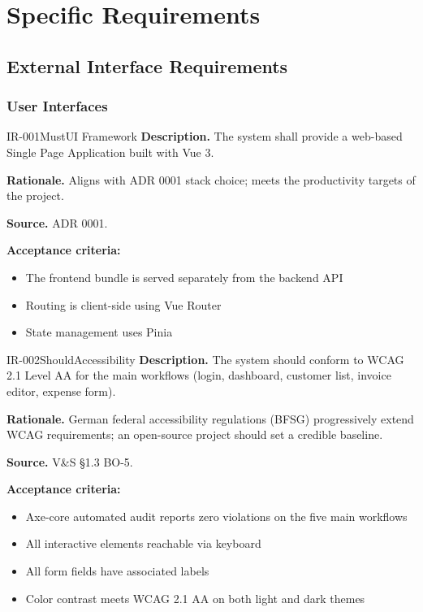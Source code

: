 \documentclass[11pt,a4paper]{article}
\begin{document}
\section{Specific Requirements}

\subsection{External Interface Requirements}

\subsubsection{User Interfaces}

\begin{requirement}{IR-001}{Must}{UI Framework}
\textbf{Description.} The system shall provide a web-based Single Page Application built with Vue 3.

\textbf{Rationale.} Aligns with ADR 0001 stack choice; meets the productivity targets of the project.

\textbf{Source.} ADR 0001.

\textbf{Acceptance criteria:}
\begin{itemize}
    \item The frontend bundle is served separately from the backend API
    \item Routing is client-side using Vue Router
    \item State management uses Pinia
\end{itemize}
\end{requirement}

\begin{requirement}{IR-002}{Should}{Accessibility}
\textbf{Description.} The system should conform to WCAG 2.1 Level AA for the main workflows (login, dashboard, customer list, invoice editor, expense form).

\textbf{Rationale.} German federal accessibility regulations (BFSG) progressively extend WCAG requirements; an open-source project should set a credible baseline.

\textbf{Source.} V\&S \S1.3 BO-5.

\textbf{Acceptance criteria:}
\begin{itemize}
    \item Axe-core automated audit reports zero violations on the five main workflows
    \item All interactive elements reachable via keyboard
    \item All form fields have associated labels
    \item Color contrast meets WCAG 2.1 AA on both light and dark themes
\end{itemize}
\end{requirement}
\end{document}
